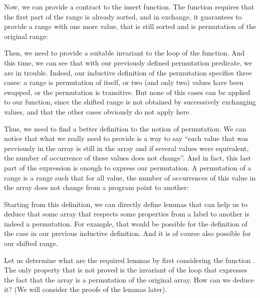 


Now, we can provide a contract to the insert function. The function requires
that the first part of the range is already sorted, and in exchange, it
guarantees to provide a range with one more value, that is still sorted and
is permutation of the original range:






Then, we need to provide a suitable invariant to the loop of the
 function. And this time, we can see that with our
previously defined permutation predicate, we are in trouble.
Indeed, our inductive definition of the permutation specifies three cases: a
range is permutation of itself, or two (and only two) values have been swapped,
or the permutation is transitive. But none of this cases can be applied to our 
 function, since the shifted range is not obtained by
successively exchanging values, and that the other cases obviously do not apply
here.



Thus, we need to find a better definition to the notion of permutation. We can
notice that what we really need to provide is a way to say ``each value that
was previously in the array is still in the array and if several values were
equivalent, the number of occurrence of these values does not change''. And in
fact, this last part of the expression is enough to express our permutation.
A permutation of a range is a range such that for all value, the number of
occurrences of this value in the array does not change from a program point to
another:






Starting from this definition, we can directly define lemmas that can help us
to deduce that some array that respects some properties from a label to another
is indeed a permutation. For example, that would be possible for the definition
of the case  in our previous inductive definition. And it is
of course also possible for our shifted range.




Let us determine what are the required lemmas by first considering the function
. The only property that is not proved is the invariant
of the loop that expresses the fact that the array is a permutation of the
original array. How can we deduce it? (We will consider the proofs of the lemmas
later).




